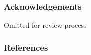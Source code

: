 \documentclass[]{article}
\begin{document}
%
%
%



\subsubsection*{Acknowledgements} 
Omitted for review process

\subsubsection*{References}




\appendix
\onecolumn
\end{document}

